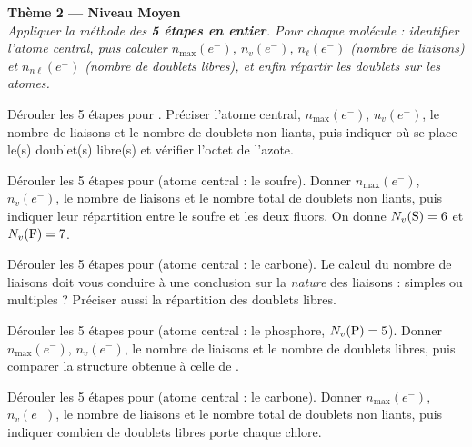 \documentclass[11pt,a4paper]{article}
\newcommand{\nmax}{n_{\max}(e^-)}
\newcommand{\nv}{n_{v}(e^-)}
\newcommand{\nl}{n_{\ell}(e^-)}
\newcommand{\nnl}{n_{n\ell}(e^-)}
\begin{document}
\begin{center}
{\Large\bfseries\color{primarydark}Thème 2 — Niveau Moyen}\\[2pt]
{\small\itshape Appliquer la méthode des \textbf{5 étapes en entier}. Pour chaque molécule :
identifier l'atome central, puis calculer $\nmax$, $\nv$, $\nl$ (nombre de liaisons) et $\nnl$
(nombre de doublets libres), et enfin \emph{répartir} les doublets sur les atomes.}
\end{center}
\medskip

\begin{exo}[l'ammoniac \ce{NH3}]
Dérouler les 5 étapes pour . Préciser l'atome central, $\nmax$, $\nv$, le nombre de
liaisons et le nombre de doublets non liants, puis indiquer où se place le(s) doublet(s) libre(s)
et vérifier l'octet de l'azote.
\end{exo}

\begin{exo}
Dérouler les 5 étapes pour  (atome central : le soufre). Donner $\nmax$, $\nv$, le nombre
de liaisons  et le nombre total de doublets non liants, puis indiquer leur répartition
entre le soufre et les deux fluors. On donne $N_v(\ce{S}) = 6$ et $N_v(\ce{F}) = 7$.
\end{exo}

\begin{exo}
Dérouler les 5 étapes pour  (atome central : le carbone). Le calcul du nombre de liaisons
doit vous conduire à une conclusion sur la \emph{nature} des liaisons  : simples ou
multiples ? Préciser aussi la répartition des doublets libres.
\end{exo}

\begin{exo}[la phosphine \ce{PH3}]
Dérouler les 5 étapes pour  (atome central : le phosphore, $N_v(\ce{P}) = 5$). Donner
$\nmax$, $\nv$, le nombre de liaisons  et le nombre de doublets libres, puis comparer la
structure obtenue à celle de .
\end{exo}

\begin{exo}
Dérouler les 5 étapes pour  (atome central : le carbone). Donner $\nmax$, $\nv$, le
nombre de liaisons  et le nombre total de doublets non liants, puis indiquer combien de
doublets libres porte chaque chlore.
\end{exo}
\end{document}
